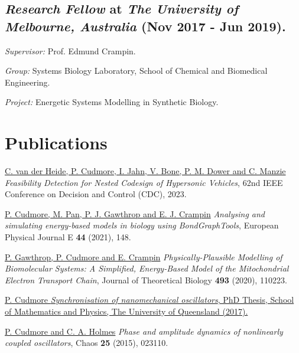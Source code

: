 \documentclass[letterpaper]{article}
\renewenvironment{itemize}{
  \begin{list}{}{
    \setlength{\leftmargin}{1.5em}
  }
}{
  \end{list}
}
\begin{document}
\subsection*{\emph{Research Fellow} at \emph{The University of Melbourne, Australia} (Nov 2017 - Jun 2019).}
\begin{itemize}
	\item \emph{Supervisor:} Prof. Edmund Crampin.
	\item \emph{Group:} Systems Biology Laboratory, School of Chemical and Biomedical Engineering.
	\item \emph{Project:} Energetic Systems Modelling in Synthetic Biology.
\end{itemize}


\section*{Publications}
\begin{itemize}
	\item \href{https://doi.org/10.1109/CDC49753.2023.10384006}{C. van der Heide, P. Cudmore, I. Jahn, V. Bone, P. M. Dower and C. Manzie} {\em Feasibility Detection for Nested Codesign of Hypersonic Vehicles}, 62nd IEEE Conference on Decision and Control (CDC), 2023.
	\item \href{https://doi.org/10.1140/epje/s10189-021-00152-4}{P. Cudmore, M. Pan, P. J. Gawthrop and E. J. Crampin} {\em Analysing and simulating energy-based models in biology using BondGraphTools}, European Physical Journal E \textbf{44} (2021), 148.
	\item \href{https://doi.org/10.1016/j.jtbi.2020.110223}{P. Gawthrop, P. Cudmore and E. Crampin} {\em Physically-Plausible Modelling of Biomolecular Systems: A Simplified, Energy-Based Model of the Mitochondrial Electron Transport Chain}, Journal of Theoretical Biology \textbf{493} (2020), 110223.
	\item \href{http://dx.doi.org/10.14264/uql.2017.462}{P. Cudmore {\em Synchronisation of nanomechanical oscillators}, PhD Thesis, School of Mathematics and Physics, The University of Queensland (2017).}
	\item \href{https://doi.org/10.1063/1.4908604}{P. Cudmore and C. A. Holmes} {\em Phase and amplitude dynamics of nonlinearly coupled oscillators}, Chaos \textbf{25} (2015), 023110.
\end{itemize}
\end{document}
